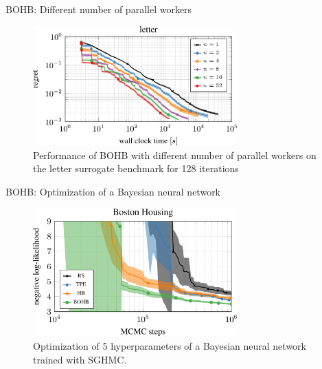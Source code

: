 \begin{frame}{BOHB: Different number of parallel workers}
\begin{figure}
    \centering
    \includegraphics[width=0.70\textwidth]{w07_hpo_grey_box/images/bohb/parallelization_letter.png}
    \caption{Performance of BOHB with different number of parallel workers on the letter surrogate benchmark for 128 iterations}
\end{figure}

\end{frame}
\begin{frame}{BOHB: Optimization of a Bayesian neural network}
\begin{figure}
    \centering
    \includegraphics[width=0.70\textwidth]{w07_hpo_grey_box/images/bohb/bnn_boston-1.png}
    \caption{Optimization of 5 hyperparameters of a Bayesian neural network trained with SGHMC.}
\end{figure}

\end{frame}

